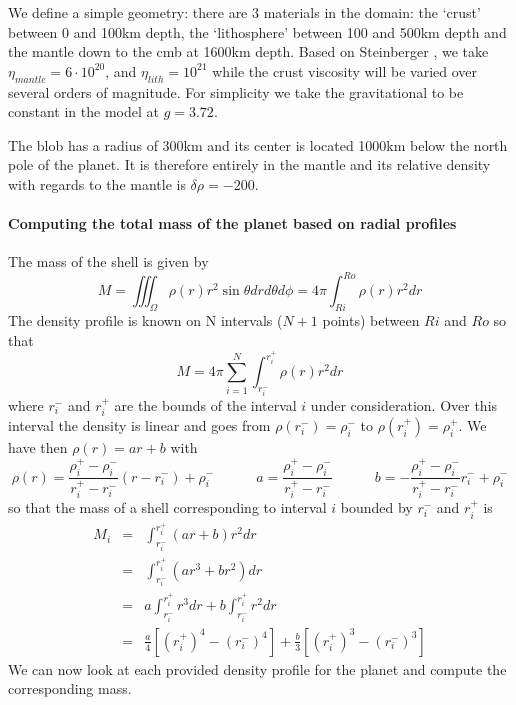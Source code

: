 We define a simple geometry: there are 3 materials in the domain: the `crust' between 0 and 100km depth, 
the `lithosphere' between 100 and 500km depth and the mantle down to the cmb at 1600km depth.
Based on Steinberger \etal \cite{stwt10}, we take $\eta_{mantle}=6\cdot 10^{20}$, and $\eta_{lith}=10^{21}$
while the crust viscosity will be varied over several orders of magnitude.
For simplicity we take the gravitational to be constant in the model at $g=3.72$.

The blob has a radius of 300km and its center is located 1000km below the north pole of the planet.
It is therefore entirely in the mantle and its relative density with regards to the mantle is $\delta\rho=-200$.

\paragraph{Computing the total mass of the planet based on radial profiles}


The mass of the shell is given by
\[
M= \iiint_\Omega \rho(r) r^2 \sin\theta dr d\theta d\phi
= 4\pi \int_{Ri}^{Ro} \rho(r) r^2 dr
\]
The density profile is known on N intervals ($N+1$ points) between $Ri$ and $Ro$ so that 
\[
M = 4\pi \sum_{i=1}^N \int_{r_i^-}^{r_i^+} \rho(r) r^2 dr
\]
where $r_i^-$ and $r_i^+$ are the bounds of the interval $i$
under consideration.
Over this interval the density is linear and goes from $\rho(r_i^-)=\rho_i^-$ to $\rho(r_i^+)=\rho_i^+$. 
We have then $\rho(r)=ar+b$ with 
\[
\rho(r) = \frac{\rho_i^+-\rho_i^-}{r_i^+-r_i^-}(r-r_i^-)+\rho_i^-
\qquad\quad
a= \frac{\rho_i^+-\rho_i^-}{r_i^+-r_i^-}
\qquad\quad
b=-\frac{\rho_i^+-\rho_i^-}{r_i^+-r_i^-}r_i^- + \rho_i^-
\]
so that the mass of a shell corresponding to interval $i$ 
bounded by $r_i^-$ and $r_i^+$ is
\begin{eqnarray}
M_i 
&=& \int_{r_i^-}^{r_i^+} (ar+b)r^2 dr  \nonumber\\
&=& \int_{r_i^-}^{r_i^+} (ar^3+br^2) dr  \nonumber\\
&=& a\int_{r_i^-}^{r_i^+} r^3 dr 
+b\int_{r_i^-}^{r_i^+} r^2 dr \nonumber\\
&=& \frac{a}{4} \left[ (r_i^+)^4 -(r_i^-)^4  \right]
+\frac{b}{3} \left[ (r_i^+)^3 -(r_i^-)^3 \right]
\end{eqnarray}
We can now look at each provided density profile for the planet and
compute the corresponding mass.




